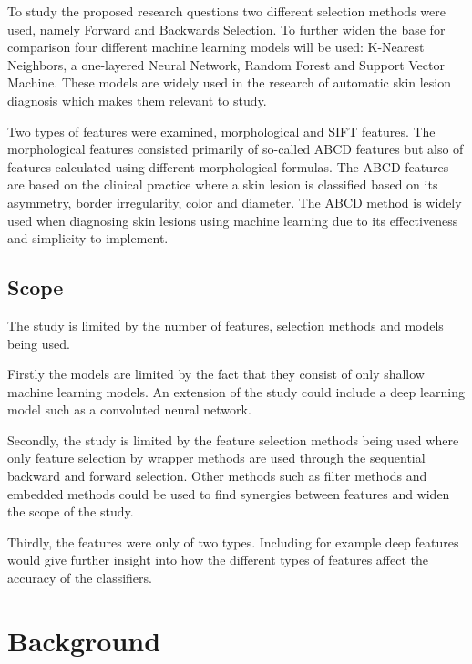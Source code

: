 \documentclass{kththesis}
\begin{document}
To study the proposed research questions two different selection methods were used, namely Forward and Backwards Selection. To further widen the base for comparison four different machine learning models will be used: K-Nearest Neighbors, a one-layered Neural Network, Random Forest and Support Vector Machine. These models are widely used in the research of automatic skin lesion diagnosis which makes them relevant to study. %

Two types of features were examined, morphological and SIFT features. The morphological features consisted primarily of so-called ABCD features but also of features calculated using different morphological formulas. The ABCD features are based on the clinical practice where a skin lesion is classified based on its asymmetry, border irregularity, color and diameter. The ABCD method is widely used when diagnosing skin lesions using machine learning due to its effectiveness and simplicity to implement. \parencite{JAIN2015735} %

\section{Scope}

The study is limited by the number of features, selection methods and models being used.

Firstly the models are limited by the fact that they consist of only shallow machine learning models. An extension of the study could include a deep learning model such as a convoluted neural network.

Secondly, the study is limited by the feature selection methods being used where only feature selection by wrapper methods are used through the sequential backward and forward selection. Other methods such as filter methods and embedded methods could be used to find synergies between features and widen the scope of the study.

Thirdly, the features were only of two types. Including for example deep features would give further insight into how the different types of features affect the accuracy of the classifiers.

\chapter{Background}
\end{document}

